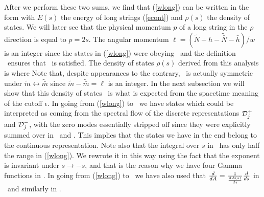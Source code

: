 After we perform these two sums, we find that (\ref{wlong}) can be written 
in the form 
with $E(s)$ the energy of long strings (\ref{econt}) and 
$\rho(s)$ the  density of states.
We will later  see that the physical momentum $p$ of a long string in 
the $\rho$ direction is equal to $p = 2 s$.
The angular momentum $\ell =(\tilde N + h - \tilde {\bar N} - \bar h)/w$
is an  integer since  the  states in (\ref{wlong}) 
were obeying \levelms\ and the definition \comb\ ensures that 
\levelml\ is satisfied. 
The density of states  $\rho(s)$ derived from this analysis is
where
Note that, despite appearances to the contrary, \density\ is 
actually symmetric under $\tilde m \leftrightarrow \tilde{\bar m}$ 
since $\tilde m - \tilde {\bar  m} = \ell$ is an integer.
In the next subsection we will show 
that this density of states  \density\ 
is what is expected from the spacetime 
meaning of the cutoff $\epsilon$. In going from 
(\ref{wlong}) to \precisecont\ we
have states which could be interpreted as coming from the spectral flow
of the discrete representations ${\cal D}_j^+ $ and
${\cal D}_j^-$, with the zero modes
essentially stripped off since they were explicitly summed over
in \divlong\ and \densecond . This implies that the states we have
in the end belong to the continuous representation. Note also
that the integral over $s$ in \precisecont\ has only half the range in 
(\ref{wlong}). We rewrote it in this way using the fact that the exponent
is invariant under $s \to -s$, and that is the reason why we have four
Gamma functions in \density .
In going from (\ref{wlong}) to \precisecont\
we have also used that $ {d \over d A} = {1 \over {d A(s) \over ds}}{d
\over ds }$ in \defa\ and similarly in \defb .


